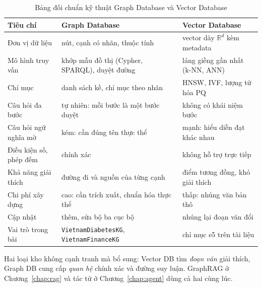 \begin{table}[H]\centering
\caption{Bảng đối chuẩn kỹ thuật Graph Database và Vector Database}\label{tab:graphvector}
{\small\begin{tabular}{L{3.2cm}L{5.4cm}L{5.4cm}}
\toprule
Tiêu chí & Graph Database & Vector Database \\
\midrule
Đơn vị dữ liệu & nút, cạnh có nhãn, thuộc tính & vector dày $\mathbb{R}^d$ kèm metadata \\
Mô hình truy vấn & khớp mẫu đồ thị (Cypher, SPARQL), duyệt đường & láng giềng gần nhất (k-NN, ANN) \\
Chỉ mục & danh sách kề, chỉ mục theo nhãn & HNSW, IVF, lượng tử hóa PQ \\
Câu hỏi đa bước & tự nhiên: mỗi bước là một bước duyệt & không có khái niệm bước \\
Câu hỏi ngữ nghĩa mờ & kém: cần đúng tên thực thể & mạnh: hiểu diễn đạt khác nhau \\
Điều kiện số, phép đếm & chính xác & không hỗ trợ trực tiếp \\
Khả năng giải thích & đường đi và nguồn của từng cạnh & điểm tương đồng, khó giải thích \\
Chi phí xây dựng & cao: cần trích xuất, chuẩn hóa thực thể & thấp: nhúng văn bản thô \\
Cập nhật & thêm, sửa bộ ba cục bộ & nhúng lại đoạn văn đổi \\
Vai trò trong bài & \texttt{VietnamDiabetesKG}, \texttt{VietnamFinanceKG} & chỉ mục e5 trên  tài liệu \\
\bottomrule
\end{tabular}}
\end{table}

Hai loại kho không cạnh tranh mà bổ sung: Vector DB tìm \emph{đoạn văn} giải thích, Graph DB cung cấp
\emph{quan hệ} chính xác và đường suy luận. GraphRAG ở Chương~\ref{chap:rag} và tác tử ở Chương~\ref{chap:agent}
dùng cả hai cùng lúc.
